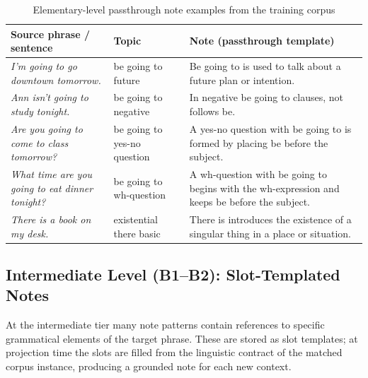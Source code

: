 \documentclass[12pt,a4paper,oneside]{report}
\begin{document}
\begin{table}[H]
  \centering
  \caption{Elementary-level passthrough note examples from the training corpus}
  \label{tab:elem-examples}
  \begin{tabularx}{\textwidth}{p{4.2cm}p{3.4cm}X}
    \toprule
    \textbf{Source phrase / sentence} & \textbf{Topic} & \textbf{Note (passthrough template)} \\
    \midrule
    \emph{I'm going to go downtown tomorrow.} & be going to future & Be going to is used to talk about a future plan or intention. \\
    \midrule
    \emph{Ann isn't going to study tonight.} & be going to negative & In negative be going to clauses, not follows be. \\
    \midrule
    \emph{Are you going to come to class tomorrow?} & be going to yes-no question & A yes-no question with be going to is formed by placing be before the subject. \\
    \midrule
    \emph{What time are you going to eat dinner tonight?} & be going to wh-question & A wh-question with be going to begins with the wh-expression and keeps be before the subject. \\
    \midrule
    \emph{There is a book on my desk.} & existential there basic & There is introduces the existence of a singular thing in a place or situation. \\
    \bottomrule
  \end{tabularx}
\end{table}

\subsection*{Intermediate Level (B1--B2): Slot-Templated Notes}

At the intermediate tier many note patterns contain references to specific grammatical elements of the target phrase. These are stored as slot templates; at projection time the slots are filled from the linguistic contract of the matched corpus instance, producing a grounded note for each new context.
\end{document}

